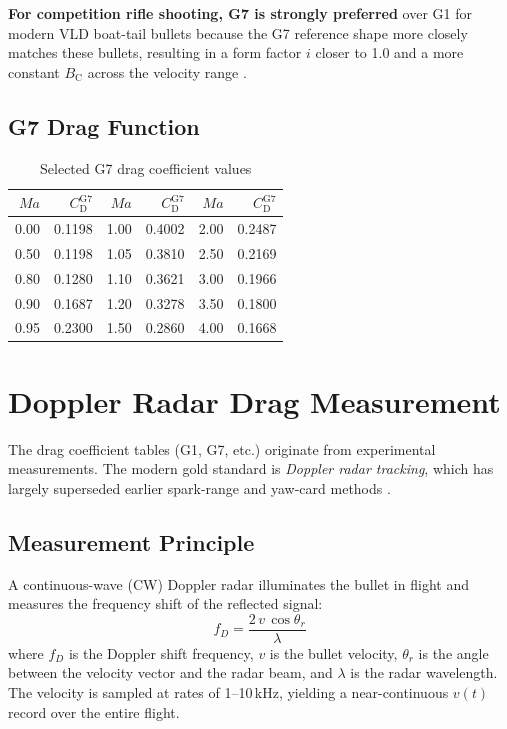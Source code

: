 \documentclass[11pt,twoside,openright]{report}
\newcommand{\Cd}{C_{\mathrm{D}}}
\newcommand{\Bc}{B_{\mathrm{C}}}
\newcommand{\Mach}{\mathit{Ma}}
\begin{document}
\textbf{For competition rifle shooting, G7 is strongly preferred} over G1 for modern VLD boat-tail bullets because the G7 reference shape more closely matches these bullets, resulting in a form factor $i$ closer to 1.0 and a more constant $\Bc$ across the velocity range \citep{litz2011applied}.

\subsection{G7 Drag Function}

\begin{table}[H]
\centering
\caption{Selected G7 drag coefficient values \citep{mccoy1999modern}}
\label{tab:g7_values}
\begin{tabular}{@{}rr@{\qquad}rr@{\qquad}rr@{}}
\toprule
$\Mach$ & $\Cd^{\mathrm{G7}}$ & $\Mach$ & $\Cd^{\mathrm{G7}}$ & $\Mach$ & $\Cd^{\mathrm{G7}}$ \\
\midrule
0.00 & 0.1198 & 1.00 & 0.4002 & 2.00 & 0.2487 \\
0.50 & 0.1198 & 1.05 & 0.3810 & 2.50 & 0.2169 \\
0.80 & 0.1280 & 1.10 & 0.3621 & 3.00 & 0.1966 \\
0.90 & 0.1687 & 1.20 & 0.3278 & 3.50 & 0.1800 \\
0.95 & 0.2300 & 1.50 & 0.2860 & 4.00 & 0.1668 \\
\bottomrule
\end{tabular}
\end{table}

\section{Doppler Radar Drag Measurement}
\label{sec:doppler}

The drag coefficient tables (G1, G7, etc.) originate from experimental measurements. The modern gold standard is \emph{Doppler radar tracking}, which has largely superseded earlier spark-range and yaw-card methods \citep{mccoy1999modern, braun1958aerodynamic}.

\subsection{Measurement Principle}

A continuous-wave (CW) Doppler radar illuminates the bullet in flight and measures the frequency shift of the reflected signal:
\begin{equation}
  f_D = \frac{2\,v\,\cos\theta_r}{\lambda}
  \label{eq:doppler_freq}
\end{equation}
where $f_D$ is the Doppler shift frequency, $v$ is the bullet velocity, $\theta_r$ is the angle between the velocity vector and the radar beam, and $\lambda$ is the radar wavelength. The velocity is sampled at rates of 1--10\,kHz, yielding a near-continuous $v(t)$ record over the entire flight.
\end{document}
